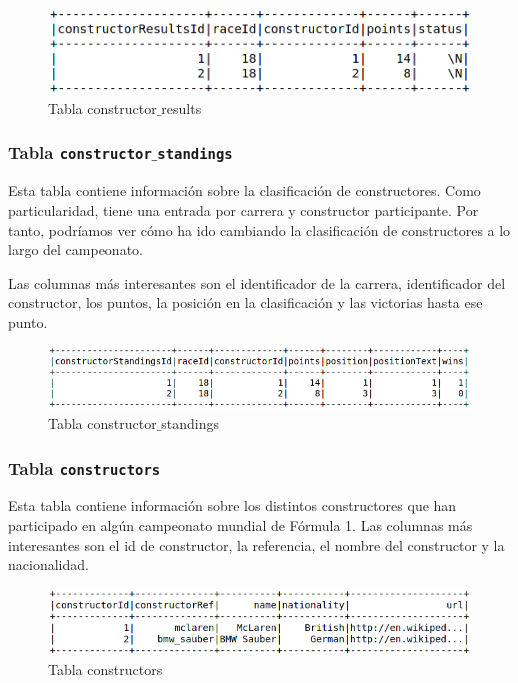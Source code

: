 \documentclass[12pt,twoside,titlepage]{report}
\begin{document}
\begin{figure}[H]
  \includegraphics[scale=0.5]{constructor_results_table.png}
  \centering
  \caption{Tabla constructor$\_$results}
  \label{fig:constructorres}
  \centering
\end{figure}


\subsubsection{Tabla \texttt{constructor$\_$standings}}

Esta tabla contiene información sobre la clasificación de constructores. Como particularidad, tiene una entrada por carrera y constructor participante. Por tanto, podríamos ver cómo ha ido cambiando la clasificación de constructores a lo largo del campeonato.

Las columnas más interesantes son el identificador de la carrera, identificador del constructor, los puntos, la posición en la clasificación y las victorias hasta ese punto. 


\begin{figure}[H]
  \includegraphics[scale=0.5]{constructor_standings_table.png}
  \centering
  \caption{Tabla constructor$\_$standings}
  \label{fig:constructorstands}
  \centering
\end{figure}

\subsubsection{Tabla \texttt{constructors}}

Esta tabla contiene información sobre los distintos constructores que han participado en algún campeonato mundial de Fórmula 1. Las columnas más interesantes son el id de constructor, la referencia, el nombre del constructor y la nacionalidad. 

\begin{figure}[H]
  \includegraphics[scale=0.5]{constructors_table.png}
  \centering
  \caption{Tabla constructors}
  \label{fig:constructors}
  \centering
\end{figure}
\end{document}
